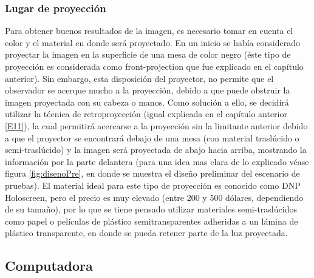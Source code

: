 \documentclass[a4paper,openright,12pt]{report}
\begin{document}
\subsubsection{Lugar de proyección}
Para obtener buenos resultados de la imagen, es necesario tomar en cuenta el color y el material en donde será proyectado. En un inicio se había considerado proyectar la imagen en la superficie de una mesa de color negro (éste tipo de proyección es considerada como front-projection que fue explicado en el capítulo anterior). Sin embargo, esta disposición del proyector, no permite que el observador se acerque mucho a la proyección, debido a que puede obstruir la imagen proyectada con su cabeza o manos. Como solución a ello, se decidirá utilizar la técnica de retroproyección (igual explicada en el capítulo anterior \hyperlink{e11}{[E11]}), la cual permitirá acercarse a la proyección sin la limitante anterior debido a que el proyector se encontrará debajo de una mesa (con material traslúcido o semi-traslúcido) y la imagen será proyectada de abajo hacia arriba, mostrando la información por la parte delantera (para una idea mas clara de lo explicado véase figura \ref{fig:disenoPre}, en donde se muestra el diseño preliminar del escenario de pruebas). El material ideal para este tipo de proyección es conocido como DNP Holoscreen, pero el precio es muy elevado (entre 200 y 500 dólares, dependiendo de su tamaño), por lo que se tiene pensado utilizar materiales semi-traslúcidos como papel o películas de plástico semitransparentes adheridas a un lámina de plástico transparente, en donde se pueda retener parte de la luz proyectada.\\
\subsection{Computadora}
\end{document}
